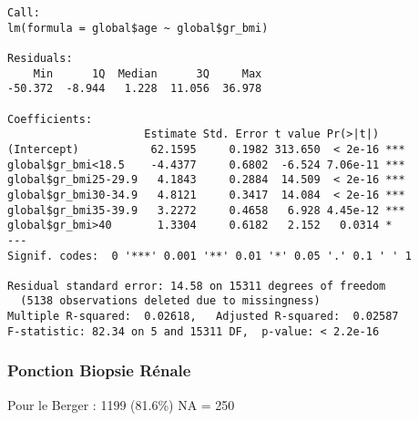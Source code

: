 \documentclass[11pt,a4paper]{article}\usepackage[]{graphicx}\usepackage[]{color}
\makeatletter
\newenvironment{kframe}{%
 \def\at@end@of@kframe{}%
 \ifinner\ifhmode%
  \def\at@end@of@kframe{\end{minipage}}%
  \begin{minipage}{\columnwidth}%
 \fi\fi%
 \def\FrameCommand##1{\hskip\@totalleftmargin \hskip-\fboxsep
 \colorbox{shadecolor}{##1}\hskip-\fboxsep
     \hskip-\linewidth \hskip-\@totalleftmargin \hskip\columnwidth}%
 \MakeFramed {\advance\hsize-\width
   \@totalleftmargin\z@ \linewidth\hsize
   \@setminipage}}%
 {\par\unskip\endMakeFramed%
 \at@end@of@kframe}
\newenvironment{knitrout}{}{} %
\makeatother
\begin{document}
\begin{knitrout}
\begin{kframe}
\begin{verbatim}
Call:
lm(formula = global$age ~ global$gr_bmi)

Residuals:
    Min      1Q  Median      3Q     Max 
-50.372  -8.944   1.228  11.056  36.978 

Coefficients:
                     Estimate Std. Error t value Pr(>|t|)    
(Intercept)           62.1595     0.1982 313.650  < 2e-16 ***
global$gr_bmi<18.5    -4.4377     0.6802  -6.524 7.06e-11 ***
global$gr_bmi25-29.9   4.1843     0.2884  14.509  < 2e-16 ***
global$gr_bmi30-34.9   4.8121     0.3417  14.084  < 2e-16 ***
global$gr_bmi35-39.9   3.2272     0.4658   6.928 4.45e-12 ***
global$gr_bmi>40       1.3304     0.6182   2.152   0.0314 *  
---
Signif. codes:  0 '***' 0.001 '**' 0.01 '*' 0.05 '.' 0.1 ' ' 1

Residual standard error: 14.58 on 15311 degrees of freedom
  (5138 observations deleted due to missingness)
Multiple R-squared:  0.02618,	Adjusted R-squared:  0.02587 
F-statistic: 82.34 on 5 and 15311 DF,  p-value: < 2.2e-16
\end{verbatim}
\end{kframe}
\end{knitrout}


      \subsubsection{Ponction Biopsie Rénale}

Pour le Berger : 1199 (81.6\%) NA = 250
\end{document}

